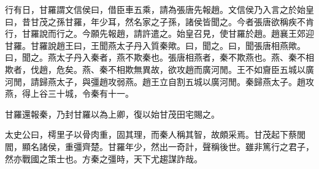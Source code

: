 行有日，甘羅謂文信侯曰，借臣車五乘，請為張唐先報趙。文信侯乃入言之於始皇曰，昔甘茂之孫甘羅，年少耳，然名家之子孫，諸侯皆聞之。今者張唐欲稱疾不肯行，甘羅說而行之。今願先報趙，請許遣之。始皇召見，使甘羅於趙。趙襄王郊迎甘羅。甘羅說趙王曰，王聞燕太子丹入質秦歟。曰，聞之。曰，聞張唐相燕歟。曰，聞之。燕太子丹入秦者，燕不欺秦也。張唐相燕者，秦不欺燕也。燕、秦不相欺者，伐趙，危矣。燕、秦不相欺無異故，欲攻趙而廣河閒。王不如齎臣五城以廣河閒，請歸燕太子，與彊趙攻弱燕。趙王立自割五城以廣河閒。秦歸燕太子。趙攻燕，得上谷三十城，令秦有十一。

甘羅還報秦，乃封甘羅以為上卿，復以始甘茂田宅賜之。

太史公曰，樗里子以骨肉重，固其理，而秦人稱其智，故頗采焉。甘茂起下蔡閭閻，顯名諸侯，重彊齊楚。甘羅年少，然出一奇計，聲稱後世。雖非篤行之君子，然亦戰國之策士也。方秦之彊時，天下尤趨謀詐哉。